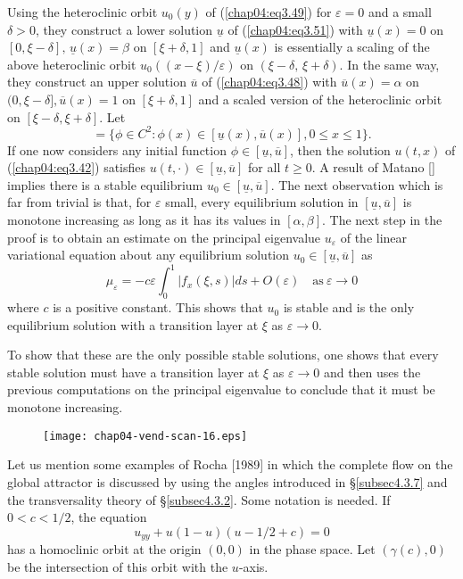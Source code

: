\documentclass{surv-l}
\theoremstyle{plain}
\theoremstyle{definition}
\numberwithin{equation}{section}
\numberwithin{figure}{chapter}
\begin{document}
Using the heteroclinic orbit $u_{0}(y)$ of (\ref{chap04:eq3.49}) for $\varepsilon=0$ and a small $\delta>0$, they construct a lower solution $\underline{u}$ of (\ref{chap04:eq3.51}) with $\underline{u}(x)=0$ on $[0,\xi-\delta],\, \underline{u}(x)=\beta$ on $[\xi+\delta,1]$ and $\underline{u}(x)$ is essentially a scaling of the above heteroclinic orbit $u_{0}((x-\xi)/\varepsilon)$ on $(\xi-\delta,\,\xi+\delta)$. In the same way, they construct an upper solution $\overline{u}$ of (\ref{chap04:eq3.48}) with $\overline{u}(x)=\alpha$ on $(0,\xi-\delta],\overline{u}(x)=1$ on $[\xi+\delta,1]$ and a scaled version of the heteroclinic orbit on $[\xi-\delta,\xi+\delta]$. Let
\begin{equation*}
[\underline{u},\overline{u}]=\{\phi\in C^{2}\!:\phi(x)\in[\underline{u}(x),\overline{u}(x)],0\leq x\leq 1\}.
\end{equation*}
If one now considers any initial function $\phi\in[\underline{u},\overline{u}]$, then the solution $u(t, x)$ of (\ref{chap04:eq3.42}) satisfies $u(t,\cdot)\in[\underline{u},\overline{u}]$ for all $t\geq 0$. A result of Matano [\citeyear{1979m}] implies there is a stable equilibrium $u_{0}\in[\underline{u},\overline{u}]$. The next observation which is far from trivial is that, for $\varepsilon$ small, every equilibrium solution in $[\underline{u},\overline{u}]$ is monotone increasing as long as it has its values in $[\alpha,\beta]$. The next step in the proof is to obtain an estimate on the principal eigenvalue $u_{\varepsilon}$ of the linear variational equation about any equilibrium solution $u_{0}\in[\underline{u},\overline{u}]$ as
\begin{equation*}
\mu_{\varepsilon}=-c\varepsilon\int_{0}^{1}|f_{x}(\xi, s)|ds+O(\varepsilon)\quad \mathrm{as}\ \varepsilon\rightarrow 0
\end{equation*}
where $c$ is a positive constant. This shows that $u_{0}$ is stable and is the only equilibrium solution with a transition layer at $\xi$ as $\varepsilon\rightarrow 0$.

To show that these are the only possible stable solutions, one shows that every stable solution must have a transition layer at $\xi$ as $\varepsilon\rightarrow 0$ and then uses the previous computations on the principal eigenvalue to conclude that it must be monotone increasing.
\begin{figure}
\texttt{[image: chap04-vend-scan-16.eps]}
\caption{}\label{fig3.14}
\end{figure}

Let us mention some examples of Rocha [1989] in which the complete flow on the global attractor is discussed by using the angles introduced in \S\ref{subsec4.3.7} and the transversality theory of \S\ref{subsec4.3.2}. Some notation is needed. If $0<c<1/2$, the equation
\begin{equation*}
u_{yy}+u(1-u)(u-1/2+c)=0
\end{equation*}
has a homoclinic orbit at the origin $(0,0)$ in the phase space. Let $(\gamma(c),0)$ be the intersection of this orbit with the $u$-axis.
\end{document}
